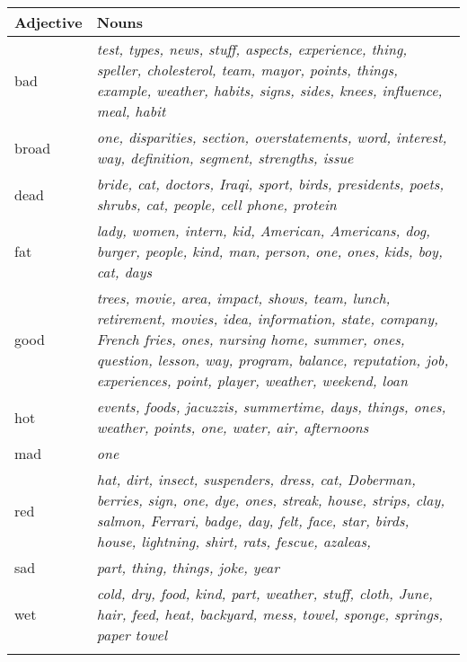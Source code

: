 \documentclass[output=paper]{langscibook}
\begin{document}
\begin{tabularx}{\textwidth}{lQ}

\lsptoprule
Adjective & Nouns\\
\midrule
bad & \textit{test, types, news, stuff, aspects, experience, thing, speller, cholesterol, team, mayor, points, things, example, weather, habits, signs, sides, knees, influence, meal, habit}\\
\tablevspace
broad & \textit{one, disparities, section, overstatements, word, interest, way, definition, segment, strengths, issue}\\
\tablevspace
dead & \textit{bride, cat, doctors, Iraqi, sport, birds, presidents, poets, shrubs, cat, people, cell phone, protein}\\
\tablevspace
fat & \textit{lady, women, intern, kid, American, Americans, dog, burger, people, kind, man, person, one, ones, kids, boy, cat, days}\\
\tablevspace
good & \textit{trees, movie, area, impact, shows, team, lunch, retirement, movies, idea, information, state, company, French fries, ones, nursing home, summer, ones, question, lesson, way, program, balance, reputation, job, experiences, point, player, weather, weekend, loan}\\
\tablevspace
hot & \textit{events, foods, jacuzzis, summertime, days, things, ones, weather, points, one, water, air, afternoons}\\
\tablevspace
mad & \textit{one}\\
\tablevspace
red & \textit{hat, dirt, insect, suspenders, dress, cat, Doberman, berries, sign, one, dye, ones, streak, house, strips, clay, salmon, Ferrari, badge, day, felt, face, star, birds, house, lightning, shirt, rats, fescue, azaleas,} \\
\tablevspace
sad & \textit{part, thing, things, joke, year} \\
\tablevspace
wet & \textit{cold, dry, food, kind, part, weather, stuff, cloth, June, hair, feed, heat, backyard, mess, towel, sponge, springs, paper towel}\\
\lspbottomrule
\end{tabularx}

{\sloppy\printbibliography[heading=subbibliography,notkeyword=this]}
\end{document}
